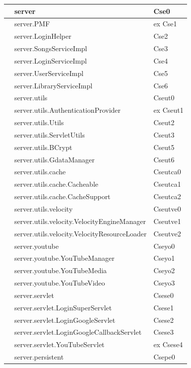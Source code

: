 \begin{footnotesize}
\begin{longtable}[h]{|l|l|l|}
& server  &  Cse0 \\\hline 
\bo{--} & server.PMF  &  ex Cse1 \\\hline 
& server.LoginHelper  &  Cse2 \\\hline 
& server.SongsServiceImpl  &  Cse3 \\\hline 
& server.LoginServiceImpl  &  Cse4 \\\hline 
& server.UserServiceImpl  &  Cse5 \\\hline 
& server.LibraryServiceImpl  &  Cse6 \\\hline 
& server.utils  &  Cseut0 \\\hline 
\bo{--} & server.utils.AuthenticationProvider  &  ex Cseut1 \\\hline 
& server.utils.Utils  &  Cseut2 \\\hline 
& server.utils.ServletUtils  &  Cseut3 \\\hline
\bo{+} & server.utils.BCrypt  &  Cseut5 \\\hline
\bo{+} & server.utils.GdataManager & Cseut6 \\\hline
\bo{+} & server.utils.cache & Cseutca0 \\\hline
\bo{+} & server.utils.cache.Cacheable & Cseutca1 \\\hline
\bo{+} & server.utils.cache.CacheSupport & Cseutca2 \\\hline
\bo{+} & server.utils.velocity & Cseutve0 \\\hline
\bo{+} & server.utils.velocity.VelocityEngineManager & Cseutve1 \\\hline
\bo{+} & server.utils.velocity.VelocityResourceLoader & Cseutve2 \\\hline
\bo{+} & server.youtube  &  Cseyo0 \\\hline
\bo{+} & server.youtube.YouTubeManager  &  Cseyo1 \\\hline
\bo{+} & server.youtube.YouTubeMedia  &  Cseyo2 \\\hline
\bo{+} & server.youtube.YouTubeVideo  &  Cseyo3 \\\hline
& server.servlet  &  Csese0 \\\hline 
& server.servlet.LoginSuperServlet  &  Csese1 \\\hline 
& server.servlet.LoginGoogleServlet  &  Csese2 \\\hline 
& server.servlet.LoginGoogleCallbackServlet  &  Csese3 \\\hline
\bo{--} & server.servlet.YouTubeServlet  &  ex Csese4 \\\hline
& server.persistent  &  Csepe0 \\\hline 

\end{longtable}
\end{footnotesize}
